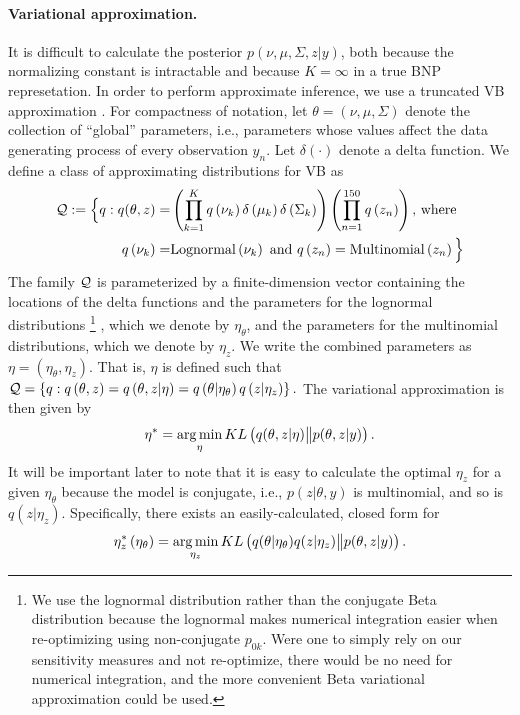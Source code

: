 %
\paragraph{Variational approximation.}
It is difficult to calculate the posterior $p\left(\nu, \mu, \Sigma, z \vert
y\right)$, both because the normalizing constant is intractable and because
$K=\infty$ in a true BNP represetation. In order to perform approximate
inference, we use a truncated VB approximation
\citep{blei:2006:dirichletbnp}. For compactness of notation, let $\theta =
\left(\nu, \mu, \Sigma\right)$ denote the collection of ``global'' parameters,
i.e., parameters whose values affect the data generating process of every
observation $y_n$.   Let $\delta\left(\cdot\right)$ denote a delta function. We
define a class of approximating distributions for VB as
%
\begin{align*}
\mathcal{Q} := \Big\{ q:
q(\theta, z) = &
\left(\prod_{k=1}^{K}q\left(\nu_{k}\right)\delta\left(\mu_{k}\right)
    \delta\left(\Sigma_{k}\right)\right)
    \left(\prod_{n=1}^{150}q\left(z_{n}\right) \right)\textrm{, where } \\
q\left(\nu_{k}\right) =& \mathrm{Lognormal}\left(\nu_k\right) \textrm{ and }
q\left(z_n\right) = \mathrm{Multinomial}\left(z_n\right)
\Big\}
\end{align*}
%
The family $\mathcal{Q}$ is parameterized by a finite-dimension vector containing
the locations of the delta functions and the parameters for the lognormal
distributions
%
\footnote{We use the lognormal distribution rather than the conjugate Beta
distribution because the lognormal makes numerical integration easier when
re-optimizing using non-conjugate $p_{0k}$.  Were one to simply rely on our
sensitivity measures and not re-optimize, there would be no need for numerical
integration, and the more convenient Beta variational approximation could be
used.}
%
, which we denote by $\eta_\theta$, and the parameters for the
multinomial distributions, which we denote by $\eta_z$. We write the combined
parameters as $\eta=\left(\eta_\theta, \eta_z\right)$. That is, $\eta$ is
defined such that
%
$\mathcal{Q} =
    \left\{q: q\left(\theta, z\right) =
            q\left(\theta, z \vert \eta \right) =
            q\left(\theta \vert \eta_\theta \right)
            q\left(z \vert \eta_z \right)
    \right\}.$
%
The variational approximation is then given by
%
\begin{align}
\eta^{*} = \operatorname*{arg\,min}_{\eta} KL\left(
    q(\theta, z \vert \eta) \big\| p(\theta, z | y)
    \right). \label{eq:kl_objective}
\end{align}
%
It will be important later to note that it is easy to calculate
the optimal $\eta_z$ for a given $\eta_\theta$ because the model is
conjugate, i.e., $p\left(z \vert \theta, y\right)$ is multinomial,
and so is $q\left(z \vert \eta_z\right)$.  Specifically, there
exists an easily-calculated, closed form for
%
\begin{align}
\eta_z^{*}\left(\eta_\theta\right) = \operatorname*{arg\,min}_{\eta_z}
    KL\left(
    q(\theta \vert \eta_\theta) q( z \vert \eta_z)
        \big\| p(\theta, z | y)
    \right).
\label{eq:z_update}
\end{align}
%

